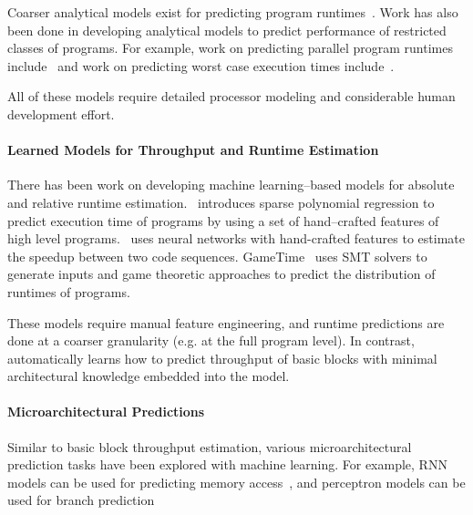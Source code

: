 Coarser analytical models exist for predicting program runtimes~\cite{park-prediction}.
Work has also been done in developing analytical models to predict performance of restricted classes of programs.
For example, work on predicting parallel program runtimes include~\cite{rugina-parallel, adve-parallel, hartleb-parallel, blanco-parallel, fahringer-parallel}
and work on predicting worst case execution times include~\cite{ferdinand-wcet,li-wcet}.

All of these models require detailed processor modeling and considerable human development effort.


\paragraph{Learned Models for Throughput and Runtime Estimation}

There has been work on developing machine learning--based models for absolute and relative runtime estimation.
\cite{sparse-reg}~introduces sparse polynomial regression to predict execution time of programs by using a set of hand--crafted features of high level programs.
\citet{suif-speedup}~uses neural networks with hand-crafted features to estimate the speedup between two code sequences.
GameTime~\cite{gametime, gametime2} uses SMT solvers to generate inputs and game theoretic approaches to predict the distribution of runtimes of programs.

These models require manual feature engineering, and runtime predictions are done at a coarser granularity (e.g. at the full program level).
In contrast, \tool{} automatically learns how to predict throughput of basic blocks with minimal architectural knowledge embedded into the model.

\paragraph{Microarchitectural Predictions}

Similar to basic block throughput estimation, various microarchitectural prediction tasks have been explored with machine learning.
For example, RNN models can be used for predicting memory access~\cite{learning-memory}, and perceptron models can be used for branch prediction~\cite{perceptron-branch}
